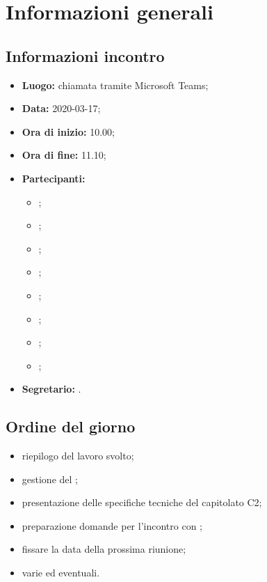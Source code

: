 \section{Informazioni generali}
\subsection{Informazioni incontro}
\begin{itemize}
	\item \textbf{Luogo:} chiamata tramite Microsoft Teams; 
	\item \textbf{Data:} 2020-03-17;
	\item \textbf{Ora di inizio:} 10.00; 
	\item \textbf{Ora di fine:} 11.10; 
	\item \textbf{Partecipanti:}
		\begin{itemize}
			\item \VB; 
			\item \LB; 
			\item \NF; 
			\item \EG; 
			\item \FJ; 
			\item \MP; 
			\item \AS; 
			\item \AZ; 
		\end{itemize}
	\item \textbf{Segretario:} \LB. 
\end{itemize}

\subsection{Ordine del giorno}
\begin{itemize}
	\item riepilogo del lavoro svolto;
	\item gestione del \Glossario{};
	\item presentazione delle specifiche tecniche del capitolato C2;
	\item preparazione domande per l'incontro con \Proponente;
	\item fissare la data della prossima riunione;
	\item varie ed eventuali.
\end{itemize}
